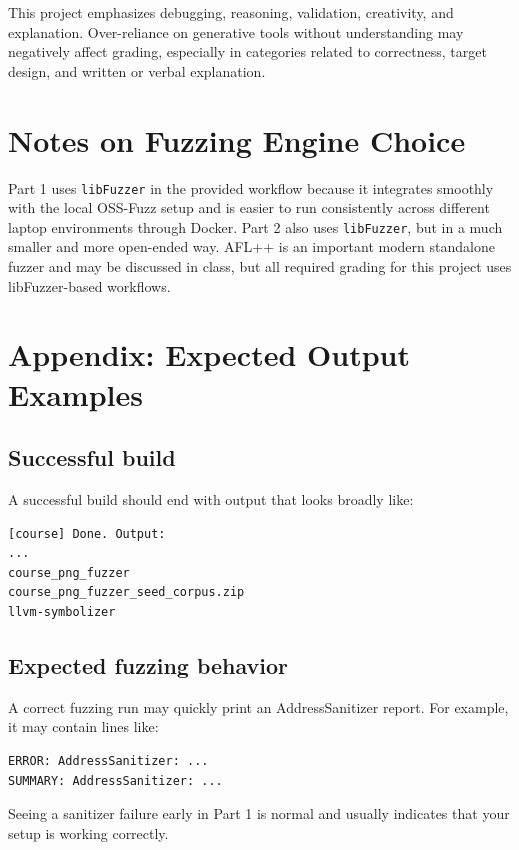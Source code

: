 \documentclass[11pt]{article}
\begin{document}
This project emphasizes debugging, reasoning, validation, creativity, and explanation. Over-reliance on generative tools without understanding may negatively affect grading, especially in categories related to correctness, target design, and written or verbal explanation.

\section*{Notes on Fuzzing Engine Choice}
Part 1 uses \texttt{libFuzzer} in the provided workflow because it integrates smoothly with the local OSS-Fuzz setup and is easier to run consistently across different laptop environments through Docker. Part 2 also uses \texttt{libFuzzer}, but in a much smaller and more open-ended way. AFL++ is an important modern standalone fuzzer and may be discussed in class, but all required grading for this project uses libFuzzer-based workflows.

\appendix
\section*{Appendix: Expected Output Examples}

\subsection*{Successful build}
A successful build should end with output that looks broadly like:
\begin{lstlisting}[style=bashstyle]
[course] Done. Output:
...
course_png_fuzzer
course_png_fuzzer_seed_corpus.zip
llvm-symbolizer
\end{lstlisting}

\subsection*{Expected fuzzing behavior}
A correct fuzzing run may quickly print an AddressSanitizer report. For example, it may contain lines like:
\begin{lstlisting}[style=bashstyle]
ERROR: AddressSanitizer: ...
SUMMARY: AddressSanitizer: ...
\end{lstlisting}

Seeing a sanitizer failure early in Part 1 is normal and usually indicates that your setup is working correctly.
\end{document}
